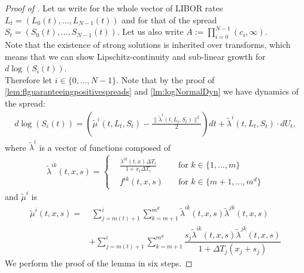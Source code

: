 \documentclass[12pt]{article}
\begin{document}
	\begin{proof}[Proof of ]
		Let us write for the whole vector of LIBOR rates $L_t = \left(L_0(t), ..., L_{N-1}(t)\right)$ and for that of the spread $S_t=\left(S_0(t), ..., S_{N-1}(t)\right)$. Let us also write $A:=\prod_{i=0}^{N-1}\left(c_i,\infty\right)$.\\
		Note that the existence of strong solutions is inherited over transforms, which means that we can show Lipschitz-continuity and sub-linear growth for $d\log\left(S_i(t)\right)$.\\
		Therefore let $i\in\{0,...,N-1\}$. Note that by the proof of \cref{lem:flguaranteeingpositivespreads} and \cref{lm:logNormalDyn} we have dynamics of the spread:
		\begin{align*}
			d\log\left(S_i(t)\right) = \left(\tilde{\mu}^i\left(t,L_t, S_t\right) - \frac{\lVert\tilde{\lambda}^i\left(t,L_t,S_t\right)\rVert ^2}{2}\right) dt
				+ \tilde{\lambda}^i\left(t,L_t, S_t\right) \cdot dU_t,
		\end{align*}
		where $\tilde{\lambda}^{i}$ is a vector of functions composed of
		\begin{align*}
			\tilde{\lambda}^{i k}\left(t,x, s\right) = 
			\left\{
			\begin{aligned}
				&\frac{\lambda^{i k}(t,x) \Delta T_i}{1 + x_i\Delta T_i} \quad &\text{for } k \in \{1,...,m\}\\
				&f^{i k}(t,x,s) \quad &\text{for } k \in \{m+1,...,m^d\}
			\end{aligned}
			\right.
		\end{align*}
		and $\tilde{\mu}^{i}$ is
		\begin{align*}
			\tilde{\mu}^i(t,x,s) = &\; \sum_{j=m(t)+1}^{i} \sum_{k=m+1}^{m^d} \tilde{\lambda}^{i k}\left(t,x, s\right) \tilde{\lambda}^{j k}\left(t,x, s\right)\\
			&+ \sum_{j=m(t)+1}^{i}\sum_{k=m+1}^{m^d}\dfrac{s_j\tilde{\lambda}^{i k}\left(t,x, s\right)\tilde{\lambda}^{j k}\left(t,x, s\right)}{1 + \Delta T_j\left(x_j + s_j\right)}
		\end{align*}
		We perform the proof of the lemma in six steps.
		

\end{proof}
\end{document}
